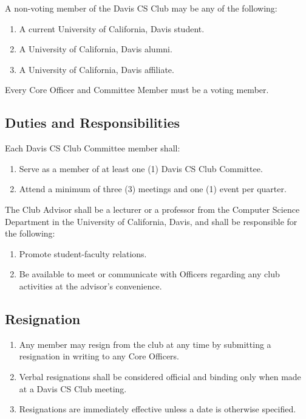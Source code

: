\documentclass{article}
\newenvironment{li}{
\begin{enumerate}
  \setlength{\itemsep}{1pt}
  \setlength{\parskip}{0pt}
  \setlength{\parsep}{0pt}
}{\end{enumerate}}
\begin{document}
\noindent A non-voting member of the Davis CS Club may be any of the following:
\begin{li}
\item A current University of California, Davis student.
\item A University of California, Davis alumni.
\item A University of California, Davis affiliate.
\end{li}

\noindent Every Core Officer and Committee Member must be a voting member.

\subsection{Duties and Responsibilities}
Each Davis CS Club Committee member shall:
\begin{li}
\item Serve as a member of at least one (1) Davis CS Club Committee.
\item Attend a minimum of three (3) meetings and one (1) event per quarter.
\end{li}

\noindent The Club Advisor shall be a lecturer or a professor from the Computer Science Department in the University of California, Davis, and shall be responsible for the following:
	\begin{li}
	\item Promote student-faculty relations.
	\item Be available to meet or communicate with Officers regarding any club activities at the advisor's convenience.
	\end{li}

\subsection{Resignation}
\begin{li}
\item Any member may resign from the club at any time by submitting a resignation in writing to any Core Officers.
\item Verbal resignations shall be considered official and binding only when made at a Davis CS Club meeting.
\item Resignations are immediately effective unless a date is otherwise specified.
\end{li}

\end{document}
